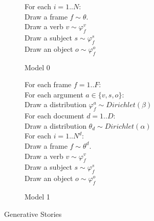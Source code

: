 \documentclass{article} %
\renewcommand\phi\varphi
\begin{document}
\begin{figure}[h]

  \begin{subfigure}[b]{0.45\textwidth}

    \begin{snugshade}
    \scriptsize
    For each $i = 1..N$:\\
    \hspace*{15pt} Draw a frame $f \sim \theta$.\\
    \hspace*{15pt} Draw a verb $v \sim \phi_f^v$\\
    \hspace*{15pt} Draw a subject $s \sim \phi_f^s$\\
    \hspace*{15pt} Draw an object $o \sim \phi_f^o$
    \end{snugshade}

    

    \caption{Model 0}
    \label{gen0}

  \end{subfigure}
  \hfill
  \begin{subfigure}[b]{0.45\textwidth}

    \begin{snugshade}
    \scriptsize
    For each frame $f=1..F$:\\
    \hspace*{15pt} For each argument $a\in\{v,s,o\}$:\\
    \hspace*{30pt} Draw a distribution $\phi_f^a\sim Dirichlet(\beta)$\\
    For each document $d=1..D$:\\
    \hspace*{15pt} Draw a distribution $\theta_d \sim Dirichlet(\alpha)$\\
    \hspace*{30pt} For each $i = 1..N^d$:\\
    \hspace*{30pt} Draw a frame $f \sim \theta^d$.\\
    \hspace*{30pt} Draw a verb $v \sim \phi_f^v$\\
    \hspace*{30pt} Draw a subject $s \sim \phi_f^s$\\
    \hspace*{30pt} Draw an object $o \sim \phi_f^o$
    \end{snugshade}

    

    \caption{Model 1}
    \label{gen1}

  \end{subfigure}

  \caption{Generative Stories}

\end{figure}
\end{document}
